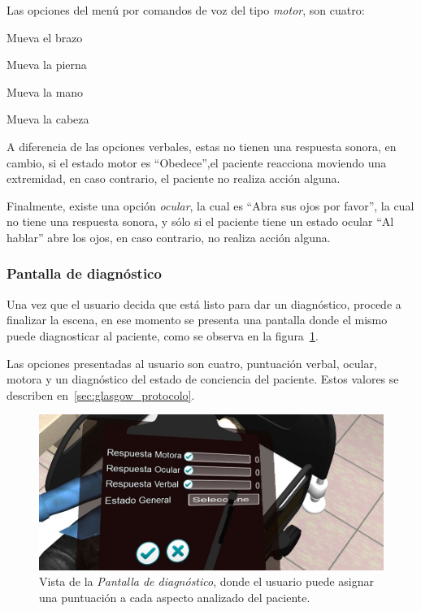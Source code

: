 Las opciones del menú por comandos de voz del tipo \emph{motor}, son cuatro: 

\begin{itemize*}
    \item Mueva el brazo
    \item Mueva la pierna
    \item Mueva la mano
    \item Mueva la cabeza
\end{itemize*}

A diferencia de las opciones verbales, estas no tienen una respuesta sonora, en
cambio, si el estado motor es \enquote{Obedece},el paciente reacciona moviendo
una extremidad, en caso contrario, el paciente no realiza acción alguna.

Finalmente, existe una opción \emph{ocular}, la cual es \enquote{Abra sus ojos por
favor}, la cual no tiene una respuesta sonora, y sólo si el paciente tiene un
estado ocular \enquote{Al hablar} abre los ojos, en caso contrario, no realiza
acción alguna.

\subsubsection{Pantalla de diagnóstico}

Una vez que el usuario decida que está listo para dar un diagnóstico, procede a
finalizar la escena, en ese momento se presenta una pantalla donde el mismo
puede diagnosticar al paciente, como se observa en la
figura~\ref{fig:glasgow_gui_resultados}.

Las opciones presentadas al usuario son cuatro, puntuación verbal, ocular,
motora y un diagnóstico del estado de conciencia del paciente. Estos valores
se describen en~\ref{sec:glasgow_protocolo}.

\begin{figure}[H]
\centering
\includegraphics[scale=0.5]{propuesta/glasgow_diagnostico.jpg}
\caption{Vista de la \emph{Pantalla de diagnóstico}, donde el usuario puede
    asignar una puntuación a cada aspecto analizado del paciente.}
\label{fig:glasgow_gui_resultados}
\end{figure}

